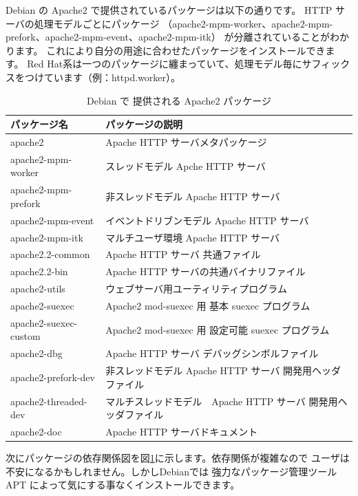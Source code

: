 \documentclass[mingoth,a4paper]{jsarticle}
\begin{document}
Debian の Apache2 で提供されているパッケージは以下の通りです。
HTTP サーバの処理モデルごとにパッケージ
（apache2-mpm-worker、apache2-mpm-prefork、apache2-mpm-event、apache2-mpm-itk）
が分離されていることがわかります。
これにより自分の用途に合わせたパッケージをインストールできます。
Red Hat系は一つのパッケージに纏まっていて、処理モデル毎にサフィックスをつけています（例：httpd.worker）。
\begin{table}[ht]
\begin{center}
\begin{tabular}{|l|l|}
\hline 
パッケージ名 & パッケージの説明\\
\hline \hline 
apache2 & Apache HTTP サーバメタパッケージ \\
\hline
apache2-mpm-worker & スレッドモデル Apche HTTP サーバ\\
\hline 
apache2-mpm-prefork & 非スレッドモデル Apache HTTP サーバ\\ 
\hline
apache2-mpm-event & イベントドリブンモデル Apache HTTP サーバ\\ 
\hline 
apache2-mpm-itk & マルチユーザ環境  Apache HTTP サーバ\\
\hline
apache2.2-common & Apache HTTP サーバ 共通ファイル \\
\hline
apache2.2-bin & Apache HTTP サーバの共通バイナリファイル\\ 
\hline
apache2-utils & ウェブサーバ用ユーティリティプログラム \\
\hline
apache2-suexec & Apache2 mod-suexec 用 基本 suexec プログラム \\
\hline
apache2-suexec-custom & Apache2 mod-suexec 用 設定可能 suexec プログラム \\
\hline
apache2-dbg & Apache HTTP サーバ デバッグシンボルファイル \\
\hline
apache2-prefork-dev & 非スレッドモデル Apache HTTP サーバ 開発用ヘッダファイル\\
\hline
apache2-threaded-dev & マルチスレッドモデル　Apache HTTP サーバ 開発用ヘッダファイル \\
\hline
apache2-doc & Apache HTTP サーバドキュメント \\
\hline
\end{tabular}
\caption{\label{tab:apache-pkg}Debian で 提供される Apache2 パッケージ}
\end{center}
\end{table}

次にパッケージの依存関係図を図\ref{tab:apache-pkg}に示します。依存関係が複雑なので
ユーザは不安になるかもしれません。しかしDebianでは
強力なパッケージ管理ツール APT によって気にする事なくインストールできます。
\end{document}
